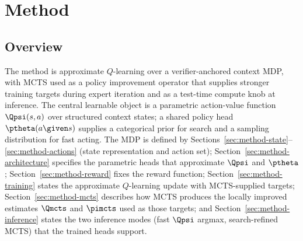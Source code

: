 \section{Method}
\label{sec:method}


\subsection{Overview}
\label{sec:method-overview}

The method is approximate $Q$-learning over a verifier-anchored context
MDP, with MCTS used as a policy improvement operator that supplies
stronger training targets during expert iteration and as a test-time
compute knob at inference. The central learnable object is a parametric
action-value function $\Qpsi(s, a)$ over structured context states; a
shared policy head $\ptheta(a \given s)$ supplies a categorical prior
for search and a sampling distribution for fast acting. The MDP is
defined by Sections~\ref{sec:method-state}--\ref{sec:method-actions}
(state representation and action set);
Section~\ref{sec:method-architecture} specifies the parametric heads
that approximate $\Qpsi$ and $\ptheta$;
Section~\ref{sec:method-reward} fixes the reward function;
Section~\ref{sec:method-training} states the approximate $Q$-learning
update with MCTS-supplied targets; Section~\ref{sec:method-mcts}
describes how MCTS produces the locally improved estimates $\Qmcts$ and
$\pimcts$ used as those targets; and Section~\ref{sec:method-inference}
states the two inference modes (fast $\Qpsi$ argmax, search-refined
MCTS) that the trained heads support.

